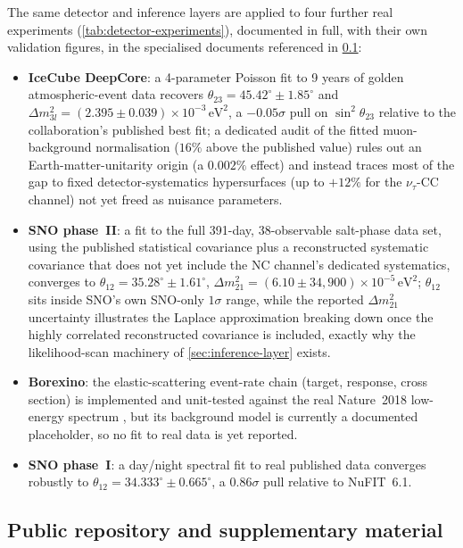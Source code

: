 The same detector and inference layers are applied to four further real experiments (\cref{tab:detector-experiments}), documented in full, with their own validation figures, in the specialised documents referenced in \cref{sec:supplementary-material}:

\begin{itemize}
  \item \textbf{IceCube DeepCore}: a 4-parameter Poisson fit to 9 years of golden atmospheric-event data recovers \(\theta_{23}=45.42^\circ\pm1.85^\circ\) and \(\Delta m^2_{3l}=(2.395\pm0.039)\times10^{-3}\,\mathrm{eV}^2\), a \(-0.05\sigma\) pull on \(\sin^2\theta_{23}\) relative to the collaboration's published best fit; a dedicated audit of the fitted muon-background normalisation (\(16\%\) above the published value) rules out an Earth-matter-unitarity origin (a \(0.002\%\) effect) and instead traces most of the gap to fixed detector-systematics hypersurfaces (up to \(+12\%\) for the \(\nu_\tau\)-CC channel) not yet freed as nuisance parameters.
  \item \textbf{SNO phase~II}: a fit to the full 391-day, 38-observable salt-phase data set, using the published statistical covariance plus a reconstructed systematic covariance that does not yet include the NC channel's dedicated systematics, converges to \(\theta_{12}=35.28^\circ\pm1.61^\circ\), \(\Delta m^2_{21}=(6.10\pm34{,}900)\times10^{-5}\,\mathrm{eV}^2\); \(\theta_{12}\) sits inside SNO's own SNO-only \(1\sigma\) range, while the reported \(\Delta m^2_{21}\) uncertainty illustrates the Laplace approximation breaking down once the highly correlated reconstructed covariance is included, exactly why the likelihood-scan machinery of \cref{sec:inference-layer} exists.
  \item \textbf{Borexino}: the elastic-scattering event-rate chain (target, response, cross section) is implemented and unit-tested against the real Nature~2018 low-energy spectrum \parencite{Agostini2018Borexino}, but its background model is currently a documented placeholder, so no fit to real data is yet reported.
  \item \textbf{SNO phase~I}: a day/night spectral fit to real published data converges robustly to \(\theta_{12}=34.333^\circ\pm0.665^\circ\), a \(0.86\sigma\) pull relative to NuFIT~6.1.
\end{itemize}

\subsection{Public repository and supplementary material}
\label{sec:supplementary-material}

